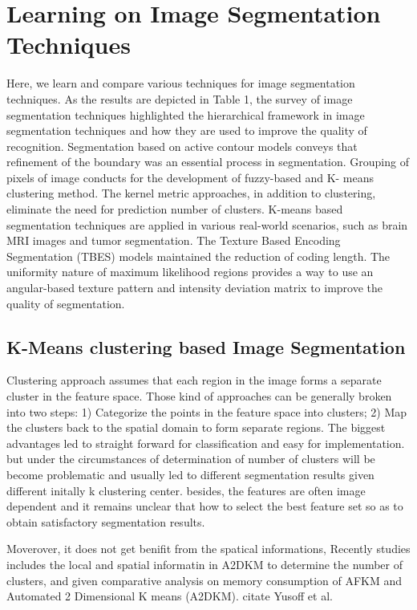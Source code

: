 \section{Learning on Image Segmentation Techniques }

Here, we learn and compare various techniques for image segmentation techniques. As the results are depicted in Table 1,  the survey of image segmentation techniques highlighted the hierarchical framework in image segmentation techniques and how they are used to improve the quality of recognition. Segmentation based on active contour models conveys that refinement of the boundary was an essential process in segmentation. Grouping of pixels of image conducts for the development of fuzzy-based and K- means clustering method. The kernel metric approaches, in addition to clustering, eliminate the need for prediction number of clusters. K-means based segmentation techniques are applied in various real-world scenarios, such as brain MRI images and tumor segmentation. The Texture Based Encoding Segmentation (TBES) models maintained the reduction of coding length. The uniformity nature of maximum likelihood regions provides a way to use an angular-based texture pattern and intensity deviation matrix to improve the quality of segmentation. 

\subsection{ K-Means clustering based Image Segmentation }
Clustering approach assumes that each region in the image forms a separate cluster in the feature space. Those kind of approaches can be generally broken into two steps: 1) Categorize the points in the feature space into clusters; 2) Map the clusters back to the spatial domain to form separate regions. The biggest advantages led to straight forward for classification and easy for implementation. but under the circumstances of  determination of number of clusters will be become problematic and usually led to different segmentation results given different initally k clustering center. besides, the features are often image dependent and it remains unclear that how to select the best feature set so as to obtain satisfactory segmentation results. 

Moverover, it does not get benifit from the spatical informations, Recently studies  includes the local and spatial informatin in A2DKM to determine the number of clusters, and given comparative analysis on  memory consumption of AFKM and Automated 2 Dimensional K means (A2DKM). citate Yusoff et al.


